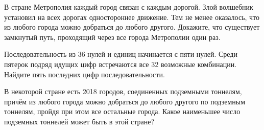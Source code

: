 \begin{exersize}
	В стране Метрополия каждый город связан с каждым дорогой. Злой волшебник установил на всех дорогах одностороннее движение. Тем не менее оказалось, что из любого города можно добраться до любого другого. Докажите, что существует замкнутый путь, проходящий через все города Метрополии один раз.
\end{exersize}

\begin{exersize}
	Последовательность из $36$ нулей и единиц начинается с пяти нулей. Среди пятерок подряд идущих цифр встречаются все $32$ возможные комбинации. Найдите пять последних цифр последовательности.	
\end{exersize}

\begin{exersize}
	В некоторой стране есть 2018 городов, соединенных подземными тоннелям, причём из любого города можно добраться до любого другого по подземным тоннелям, пройдя при этом все остальные города. Какое наименьшее число подземных тоннелей может быть в этой стране?
\end{exersize}

